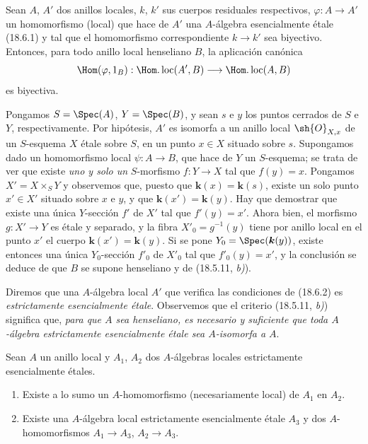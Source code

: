 \begin{lemma}[18.6.2]
\label{IV.18.6.2}
Sean $A$, $A'$ dos anillos locales, $k$, $k'$ sus cuerpos residuales respectivos, $\varphi:A\to A'$ un homomorfismo (local) que hace de $A'$ una $A$-álgebra esencialmente étale \textup{(18.6.1)} y tal que el homomorfismo correspondiente $k\to k'$ sea biyectivo. Entonces, para todo anillo local \textup{henseliano} $B$, la aplicación canónica
\[
  \Hom(\varphi,1_B):\Hom.\operatorname{loc}(A',B)\longrightarrow\Hom.\operatorname{loc}(A,B)
\]
es biyectiva.
\end{lemma}

Pongamos $S=\Spec(A)$, $Y=\Spec(B)$, y sean $s$ e $y$ los puntos cerrados de $S$ e $Y$, respectivamente. Por hipótesis, $A'$ es isomorfa a un anillo local $\sh{O}_{X,x}$ de un $S$-esquema $X$ étale sobre $S$, en un punto $x\in X$ situado sobre $s$. Supongamos dado un homomorfismo local $\psi:A\to B$, que hace de $Y$ un $S$-esquema; se trata de ver que existe \emph{uno y solo un} $S$-morfismo $f:Y\to X$ tal que $f(y)=x$. Pongamos $X'=X\times_S Y$ y observemos que, puesto que $\boldsymbol{k}(x)=\boldsymbol{k}(s)$, existe un solo punto $x'\in X'$ situado sobre $x$ e $y$, y que $\boldsymbol{k}(x')=\boldsymbol{k}(y)$. Hay que demostrar que existe una única $Y$-sección $f'$ de $X'$ tal que $f'(y)=x'$. Ahora bien, el morfismo $g:X'\to Y$ es étale y separado, y la fibra $X'_0=g^{-1}(y)$ tiene por anillo local en el punto $x'$ el cuerpo $\boldsymbol{k}(x')=\boldsymbol{k}(y)$. Si se pone $Y_0=\Spec(\boldsymbol{k}(y))$, existe entonces una única $Y_0$-sección $f'_0$ de $X'_0$ tal que $f'_0(y)=x'$, y la conclusión se deduce de que $B$ se supone henseliano y de (18.5.11, \emph{b)}).

Diremos que una $A$-álgebra local $A'$ que verifica las condiciones de (18.6.2) es \emph{estrictamente esencialmente étale}. Observemos que el criterio (18.5.11, \emph{b)}) significa que, \emph{para que $A$ sea henseliano, es necesario y suficiente que toda $A$-álgebra estrictamente esencialmente étale sea $A$-isomorfa a $A$}.

\begin{lemma}[18.6.3]
\label{IV.18.6.3}
Sean $A$ un anillo local y $A_1$, $A_2$ dos $A$-álgebras locales estrictamente esencialmente étales.
\begin{enumerate}
  \item[\textup{(i)}] Existe a lo sumo un $A$-homomorfismo (necesariamente local) de $A_1$ en $A_2$.
  \item[\textup{(ii)}] Existe una $A$-álgebra local estrictamente esencialmente étale $A_3$ y dos $A$-homomorfismos $A_1\to A_3$, $A_2\to A_3$.
\end{enumerate}
\end{lemma}

